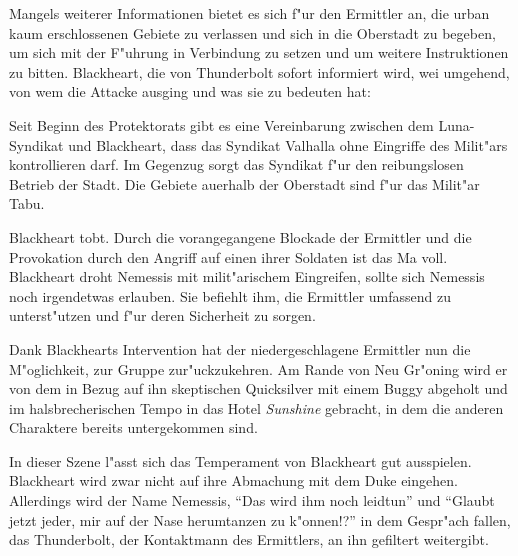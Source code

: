 Mangels weiterer Informationen bietet es sich f"ur den Ermittler an, die urban kaum erschlossenen Gebiete zu verlassen und sich in die Oberstadt zu begeben, um sich mit der F"uhrung in Verbindung zu setzen und um weitere Instruktionen zu bitten. Blackheart, die von Thunderbolt sofort informiert wird, wei\3 umgehend, von wem die Attacke ausging und was sie zu bedeuten hat:

Seit Beginn des Protektorats gibt es eine Vereinbarung zwischen dem Luna-Syndikat und Blackheart, dass das Syndikat Valhalla ohne Eingriffe des Milit"ars kontrollieren darf. Im Gegenzug sorgt das Syndikat f"ur den reibungslosen Betrieb der Stadt. Die Gebiete au\3erhalb der Oberstadt sind f"ur das Milit"ar Tabu.

Blackheart tobt. Durch die vorangegangene Blockade der Ermittler und die Provokation durch den Angriff auf einen ihrer Soldaten ist das Ma\3 voll. Blackheart droht Nemessis mit milit"arischem Eingreifen, sollte sich Nemessis noch irgendetwas erlauben. Sie befiehlt ihm, die Ermittler umfassend zu unterst"utzen und f"ur deren Sicherheit zu sorgen.

Dank Blackhearts Intervention hat der niedergeschlagene Ermittler nun die M"oglichkeit, zur Gruppe zur"uckzukehren. Am Rande von Neu Gr"oning wird er von dem in Bezug auf ihn skeptischen Quicksilver mit einem Buggy abgeholt und im halsbrecherischen Tempo in das Hotel \emph{Sunshine} gebracht, in dem die anderen Charaktere bereits untergekommen sind.

\begin{remarks}
	In dieser Szene l"asst sich das Temperament von Blackheart gut ausspielen. Blackheart wird zwar nicht auf ihre Abmachung mit dem Duke eingehen. Allerdings wird der Name Nemessis, "`Das wird ihm noch leidtun"' und "`Glaubt jetzt jeder, mir auf der Nase herumtanzen zu k"onnen!?"' in dem Gespr"ach fallen, das Thunderbolt, der Kontaktmann des Ermittlers, an ihn gefiltert weitergibt.
\end{remarks}
